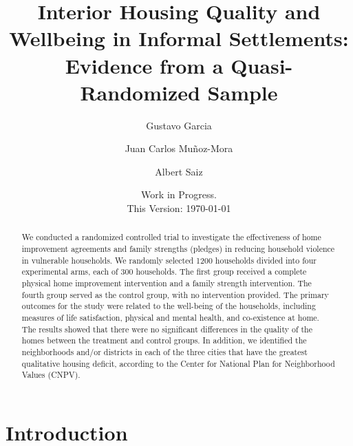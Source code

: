     

    \usepackage{booktabs}%
    \newcommand{\tabitem}{~~\llap{\textbullet}~~}

    \title{Interior Housing Quality and Wellbeing in Informal Settlements:  \\ 
    Evidence from a Quasi-Randomized Sample}
    
    \author[1]{Gustavo Garcia}
    \author[1]{Juan Carlos Muñoz-Mora}
    \author[2]{Albert Saiz}


    \date{Work in Progress. \\ This Version: \today}

\usepackage{graphicx}

   

    \maketitle
        \begin{abstract}
         We conducted a randomized controlled trial to investigate the effectiveness of home improvement agreements and family strengths (pledges) in reducing household violence in vulnerable households. We randomly selected 1200 households divided into four experimental arms, each of 300 households. The first group received a complete physical home improvement intervention and a family strength intervention. The fourth group served as the control group, with no intervention provided. The primary outcomes for the study were related to the well-being of the households, including measures of life satisfaction, physical and mental health, and co-existence at home. The results showed that there were no significant differences in the quality of the homes between the treatment and control groups. In addition, we identified the neighborhoods and/or districts in each of the three cities that have the greatest qualitative housing deficit, according to the Center for National Plan for Neighborhood Values (CNPV).
        \end{abstract}



\newpage
\section{Introduction}

